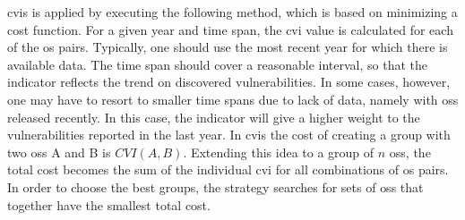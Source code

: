 \gls{cvis} is applied by executing the following method, which is based on minimizing a cost function. 
For a given year and time span, the \gls{cvi} value is calculated for each of the \gls{os} pairs. 
Typically, one should use the most recent year for which there is available data. 
The time span should cover a reasonable interval, so that the indicator reflects the trend on discovered vulnerabilities. 
In some cases, however, one may have to resort to smaller time spans due to lack of data, namely with \glspl{os} released recently. 
In this case, the indicator will give a higher weight to the vulnerabilities reported in the last year. 
In \gls{cvis} the cost of creating a group with two \glspl{os} A and B is $\mathit{CVI}(A,B)$. 
Extending this idea to a group of $n$ \glspl{os}, the total cost becomes the sum of the individual \gls{cvi} for all combinations of \gls{os} pairs.
In order to choose the best groups, the strategy searches for sets of \glspl{os} that together have the smallest total cost.

